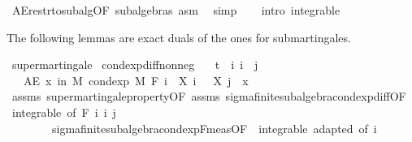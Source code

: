\begin{isabellebody}
\ AE{\isacharunderscore}{\kern0pt}restr{\isacharunderscore}{\kern0pt}to{\isacharunderscore}{\kern0pt}subalg{\isacharbrackleft}{\kern0pt}OF\ subalgebras{\isacharbrackright}{\kern0pt}\ asm\ \isamarkupfalse%
\ simp\isanewline
\ \ \isacommand{{\isacharbraceright}{\kern0pt}}\isamarkupfalse%
\isanewline
{}\isamarkupfalse%
\ {\isacharparenleft}{\kern0pt}intro\ integrable{\isacharparenright}{\kern0pt}%
\endisatagproof
{\isafoldproof}%
%
\isadelimproof
%
\endisadelimproof
%
\isadelimdocument
%
\endisadelimdocument
%
\isatagdocument
%
\isamarkuptrue%
%
\endisatagdocument
{\isafolddocument}%
%
\isadelimdocument
%
\endisadelimdocument
%
\begin{isamarkuptext}%
The following lemmas are exact duals of the ones for submartingales.%
\end{isamarkuptext}\isamarkuptrue%
\isamarkupfalse%
\ supermartingale\isanewline
{}\isanewline
\isanewline
{}\isamarkupfalse%
\ cond{\isacharunderscore}{\kern0pt}exp{\isacharunderscore}{\kern0pt}diff{\isacharunderscore}{\kern0pt}nonneg{\isacharcolon}{\kern0pt}\isanewline
\ \ \ {\isachardoublequoteopen}t\ {\isasymle}\ i{\isachardoublequoteclose}\ {\isachardoublequoteopen}i\ {\isasymle}\ j{\isachardoublequoteclose}\isanewline
\ \ \ {\isachardoublequoteopen}AE\ x\ in\ M{\isachardot}{\kern0pt}\ cond{\isacharunderscore}{\kern0pt}exp\ M\ {\isacharparenleft}{\kern0pt}F\ i{\isacharparenright}{\kern0pt}\ {\isacharparenleft}{\kern0pt}{\isasymlambda}{\isasymxi}{\isachardot}{\kern0pt}\ X\ i\ {\isasymxi}\ {\isacharminus}{\kern0pt}\ X\ j\ {\isasymxi}{\isacharparenright}{\kern0pt}\ x\ {\isasymge}\ {}{\isachardoublequoteclose}\isanewline
%
\isadelimproof
\ \ %
\endisadelimproof
%
\isatagproof
{}\isamarkupfalse%
\ assms\ supermartingale{\isacharunderscore}{\kern0pt}property{\isacharbrackleft}{\kern0pt}OF\ assms{\isacharbrackright}{\kern0pt}\ sigma{\isacharunderscore}{\kern0pt}finite{\isacharunderscore}{\kern0pt}subalgebra{\isachardot}{\kern0pt}cond{\isacharunderscore}{\kern0pt}exp{\isacharunderscore}{\kern0pt}diff{\isacharbrackleft}{\kern0pt}OF\ {\isacharunderscore}{\kern0pt}\ integrable{\isacharparenleft}{\kern0pt}{}{\isacharcomma}{\kern0pt}{}{\isacharparenright}{\kern0pt}{\isacharcomma}{\kern0pt}\ of\ {\isachardoublequoteopen}F\ i{\isachardoublequoteclose}\ i\ j{\isacharbrackright}{\kern0pt}\ \isanewline
\ \ \ \ \ \ \ \ sigma{\isacharunderscore}{\kern0pt}finite{\isacharunderscore}{\kern0pt}subalgebra{\isachardot}{\kern0pt}cond{\isacharunderscore}{\kern0pt}exp{\isacharunderscore}{\kern0pt}F{\isacharunderscore}{\kern0pt}meas{\isacharbrackleft}{\kern0pt}OF\ {\isacharunderscore}{\kern0pt}\ integrable\ adapted{\isacharcomma}{\kern0pt}\ of\ i{\isacharbrackright}{\kern0pt}\ \isamarkupfalse%

\end{isabellebody}
